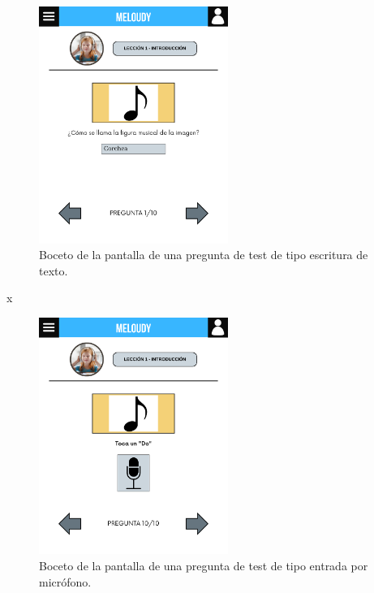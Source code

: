 \begin{figure}[H]
    \centering
    \centerline{\includegraphics[width=0.55\textwidth, frame]{imagenes/c6/7.png}}
    \caption{Boceto de la pantalla de una pregunta de test de tipo escritura de texto.}
    \label{fig:escrituratexto}
\end{figure}

x
\begin{figure}[H]
    \centering
    \centerline{\includegraphics[width=0.55\textwidth, frame]{imagenes/c6/8.png}}
    \caption{Boceto de la pantalla de una pregunta de test de tipo entrada por micrófono.}
    \label{fig:microfono}
\end{figure}

\newpage

